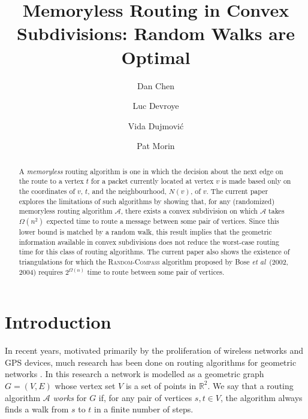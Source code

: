 \documentclass{elsarticle}
\newcommand{\R}{\mathbb{R}}
\newcommand{\etal}{\emph{et al}}
\begin{document}
\begin{frontmatter}
\title{Memoryless Routing in Convex Subdivisions: \newline 
       Random Walks are Optimal}
\author[carleton]{Dan Chen}
\author[mcgill]{Luc Devroye}
\author[carleton]{Vida Dujmovi\'c}
\author[carleton]{Pat Morin}
\address[carleton]{School of Computer Science, Carleton University,
        1125 Colonel By Drive \\ Ottawa, Ontario, Canada, K1S~5B6}
\address[mcgill]{School of Computer Science, McGill University, 3480 University Street \\
Montreal, Qu\'ebec, Canada, H3A 2A7}

\begin{abstract}
A \emph{memoryless} routing algorithm is one in which the decision
about the next edge on the route to a vertex $t$ for a packet currently
located at vertex $v$ is made based only on the coordinates of $v$, $t$,
and the neighbourhood, $N(v)$, of $v$.  The current paper explores the
limitations of such algorithms by showing that, for any (randomized)
memoryless routing algorithm $\mathcal{A}$, there exists a convex
subdivision on which $\mathcal{A}$ takes $\Omega(n^2)$ expected
time to route a message between some pair of vertices.  Since this
lower bound is matched by a random walk, this result implies that the
geometric information available in convex subdivisions does not reduce the worst-case routing time for this class
of routing algorithms.  The current paper also shows
the existence of triangulations for which the \textsc{Random-Compass}
algorithm proposed by Bose \etal\ (2002, 2004) requires $2^{\Omega(n)}$
time to route between some pair of vertices.
\end{abstract}
\end{frontmatter}

\section{Introduction}
\label{sec:intro}

In recent years, motivated primarily by the proliferation of wireless networks and GPS devices, much research has been done on routing algorithms for geometric networks \cite{gior03}.  In this research a network is modelled as a geometric graph $G=(V,E)$ whose vertex set $V$ is a set of points in $\R^2$. We say that a routing algorithm $\mathcal{A}$ \emph{works} for $G$ if, for any pair of vertices $s,t\in V$, the algorithm always finds a walk from $s$ to $t$ in a finite number of steps.
\end{document}
